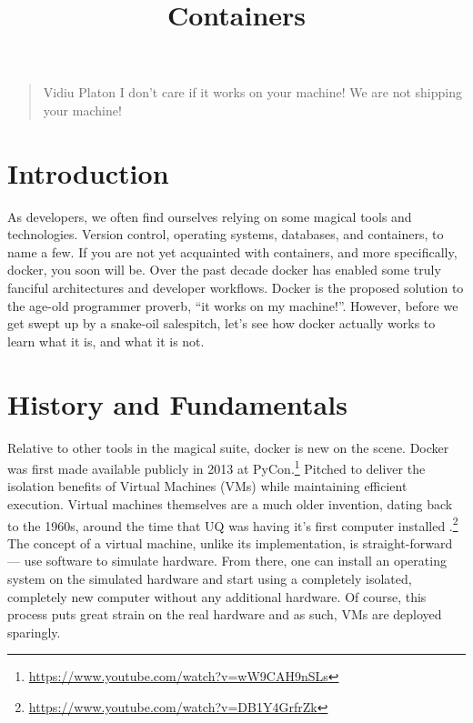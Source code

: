 \title{Containers}
\maketitle


\begin{quote}{Vidiu Platon}
I don't care if it works on your machine! We are not shipping your machine!
\end{quote}

\section{Introduction}
As developers, we often find ourselves relying on some magical tools and technologies.
Version control, operating systems, databases, and containers, to name a few.
If you are not yet acquainted with containers, and more specifically, docker, you soon will be.
Over the past decade docker has enabled some truly fanciful architectures and developer workflows.
Docker is the proposed solution to the age-old programmer proverb, ``it works on my machine!''.
However, before we get swept up by a snake-oil salespitch, let's see how docker actually works to learn what it is, and what it is not.

\section{History and Fundamentals}
Relative to other tools in the magical suite, docker is new on the scene.
Docker was first made available publicly in 2013 at PyCon.\footnote{\url{https://www.youtube.com/watch?v=wW9CAH9nSLs}}
Pitched to deliver the isolation benefits of Virtual Machines (VMs) while maintaining efficient execution.
Virtual machines themselves are a much older invention, dating back to the 1960s, around the time that UQ was having it's first computer installed%
.\footnote{\url{https://www.youtube.com/watch?v=DB1Y4GrfrZk}}
The concept of a virtual machine, unlike its implementation, is straight-forward --- use software to simulate hardware.
From there, one can install an operating system on the simulated hardware and start using a completely isolated, completely new computer without any additional hardware.
Of course, this process puts great strain on the real hardware and as such, VMs are deployed sparingly.

